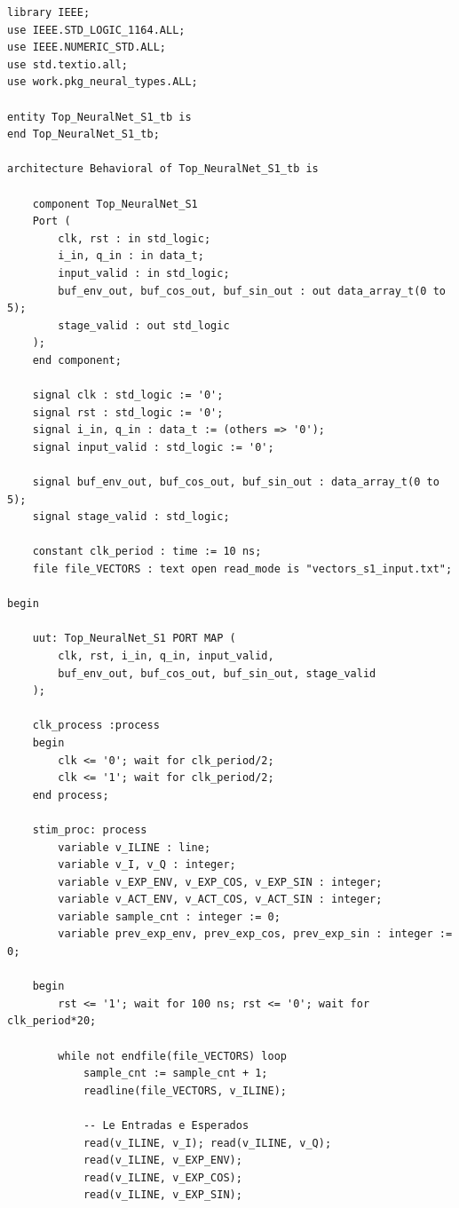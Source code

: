 \documentclass[a4paper,12pt]{article}
\begin{document}
\begin{lstlisting}[style=vhdlstyle,
    caption={Testbench do \texttt{Top\_NeuralNet\_S1} com leitura de arquivo de vetores.},
    label={lst:top_s1_tb}]
library IEEE;
use IEEE.STD_LOGIC_1164.ALL;
use IEEE.NUMERIC_STD.ALL;
use std.textio.all;
use work.pkg_neural_types.ALL;

entity Top_NeuralNet_S1_tb is
end Top_NeuralNet_S1_tb;

architecture Behavioral of Top_NeuralNet_S1_tb is

    component Top_NeuralNet_S1
    Port (
        clk, rst : in std_logic;
        i_in, q_in : in data_t;
        input_valid : in std_logic;
        buf_env_out, buf_cos_out, buf_sin_out : out data_array_t(0 to 5);
        stage_valid : out std_logic
    );
    end component;

    signal clk : std_logic := '0';
    signal rst : std_logic := '0';
    signal i_in, q_in : data_t := (others => '0');
    signal input_valid : std_logic := '0';

    signal buf_env_out, buf_cos_out, buf_sin_out : data_array_t(0 to 5);
    signal stage_valid : std_logic;

    constant clk_period : time := 10 ns;
    file file_VECTORS : text open read_mode is "vectors_s1_input.txt";

begin

    uut: Top_NeuralNet_S1 PORT MAP (
        clk, rst, i_in, q_in, input_valid,
        buf_env_out, buf_cos_out, buf_sin_out, stage_valid
    );

    clk_process :process
    begin
        clk <= '0'; wait for clk_period/2;
        clk <= '1'; wait for clk_period/2;
    end process;

    stim_proc: process
        variable v_ILINE : line;
        variable v_I, v_Q : integer;
        variable v_EXP_ENV, v_EXP_COS, v_EXP_SIN : integer;
        variable v_ACT_ENV, v_ACT_COS, v_ACT_SIN : integer;
        variable sample_cnt : integer := 0;
        variable prev_exp_env, prev_exp_cos, prev_exp_sin : integer := 0;

    begin
        rst <= '1'; wait for 100 ns; rst <= '0'; wait for clk_period*20;

        while not endfile(file_VECTORS) loop
            sample_cnt := sample_cnt + 1;
            readline(file_VECTORS, v_ILINE);

            -- Le Entradas e Esperados
            read(v_ILINE, v_I); read(v_ILINE, v_Q);
            read(v_ILINE, v_EXP_ENV);
            read(v_ILINE, v_EXP_COS);
            read(v_ILINE, v_EXP_SIN);


\end{lstlisting}
\end{document}
